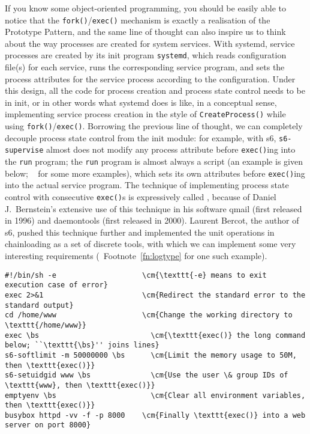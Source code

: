 If you know some object-oriented programming, you should be easily able to
notice that the \verb|fork()|/\verb|exec()| mechanism is exactly a realisation
of the Prototype Pattern, and the same line of thought can also inspire us
to think about the way processes are created for system services.  With systemd,
service processes are created by its init program \verb|systemd|, which reads
configuration file(s) for each service, runs the corresponding service program,
and sets the process attributes for the service process according to the
configuration.  Under this design, all the code for process creation and process
state control needs to be in init, or in other words what systemd does is like,
in a conceptual sense, implementing service process creation in the style of
\verb|CreateProcess()| while using \verb|fork()|/\verb|exec()|.  Borrowing
the previous line of thought, we can completely decouple process state control
from the init module: for example, with s6, \verb|s6-supervise| almost does
not modify any process attribute before \verb|exec()|ing into the \verb|run|
program; the \verb|run| program is almost always a script (an example is given
below; \cf~\parencite{pollard2014} for some more examples), which sets its
own attributes before \verb|exec()|ing into the actual service program.  The
technique of implementing process state control with consecutive \verb|exec()|s
is expressively called , because of Daniel
J.\ Bernstein's extensive use of this technique in his software qmail (first
released in 1996) and daemontools (first released in 2000).  Laurent Bercot,
the author of s6, pushed this technique further and implemented the unit
operations in chainloading as a set of discrete tools,
with which we can implement some very interesting requirements
(\cf~Footnote~\ref{fn:logtype} for one such example).
\begin{wquoting}
\begin{Verbatim}[commandchars = {\\\{\}}]
#!/bin/sh -e                    \cm{\texttt{-e} means to exit execution case of error}
exec 2>&1                       \cm{Redirect the standard error to the standard output}
cd /home/www                    \cm{Change the working directory to \texttt{/home/www}}
exec \bs                          \cm{\texttt{exec()} the long command below; ``\texttt{\bs}'' joins lines}
s6-softlimit -m 50000000 \bs      \cm{Limit the memory usage to 50M, then \texttt{exec()}}
s6-setuidgid www \bs              \cm{Use the user \& group IDs of \texttt{www}, then \texttt{exec()}}
emptyenv \bs                      \cm{Clear all environment variables, then \texttt{exec()}}
busybox httpd -vv -f -p 8000    \cm{Finally \texttt{exec()} into a web server on port 8000}
\end{Verbatim}
\end{wquoting}


